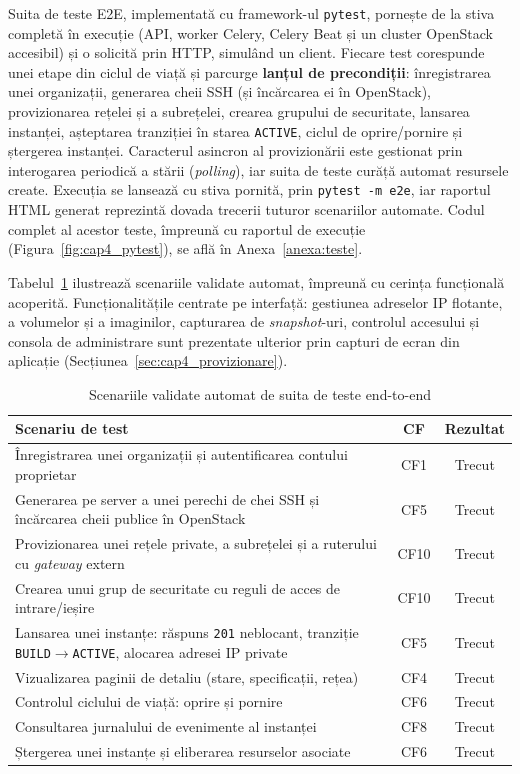 Suita de teste E2E, implementată cu framework-ul \texttt{pytest}, pornește de la stiva completă în execuție (API, worker Celery, Celery Beat și un cluster OpenStack accesibil) și o solicită prin HTTP, simulând un client. Fiecare test corespunde unei etape din ciclul de viață și parcurge \textbf{lanțul de precondiții}: înregistrarea unei organizații, generarea cheii SSH (și încărcarea ei în OpenStack), provizionarea rețelei și a subrețelei, crearea grupului de securitate, lansarea instanței, așteptarea tranziției în starea \texttt{ACTIVE}, ciclul de oprire/pornire și ștergerea instanței. Caracterul asincron al provizionării este gestionat prin interogarea periodică a stării (\textit{polling}), iar suita de teste curăță automat resursele create. Execuția se lansează cu stiva pornită, prin \texttt{pytest -m e2e}, iar raportul HTML generat reprezintă dovada trecerii tuturor scenariilor automate. Codul complet al acestor teste, împreună cu raportul de execuție (Figura~\ref{fig:cap4_pytest}), se află în Anexa~\ref{anexa:teste}.

\noindent Tabelul~\ref{tab:cap4_testcases} ilustrează scenariile validate automat, împreună cu cerința funcțională acoperită. Funcționalitățile centrate pe interfață: gestiunea adreselor IP flotante, a volumelor și a imaginilor, capturarea de \textit{snapshot}-uri, controlul accesului și consola de administrare sunt prezentate ulterior prin capturi de ecran din aplicație (Secțiunea~\ref{sec:cap4_provizionare}).

\begin{table}[H]
    \centering
    \caption{Scenariile validate automat de suita de teste end-to-end}
    \label{tab:cap4_testcases}
    \begin{tabular}{|p{9.4cm}|c|c|}
        \hline
        \textbf{Scenariu de test} & \textbf{CF} & \textbf{Rezultat} \\ \hline
        Înregistrarea unei organizații și autentificarea contului proprietar & CF1 & Trecut \\ \hline
        Generarea pe server a unei perechi de chei SSH și încărcarea cheii publice în OpenStack & CF5 & Trecut \\ \hline
        Provizionarea unei rețele private, a subrețelei și a ruterului cu \textit{gateway} extern & CF10 & Trecut \\ \hline
        Crearea unui grup de securitate cu reguli de acces de intrare/ieșire & CF10 & Trecut \\ \hline
        Lansarea unei instanțe: răspuns \texttt{201} neblocant, tranziție \texttt{BUILD}$\rightarrow$\texttt{ACTIVE}, alocarea adresei IP private & CF5 & Trecut \\ \hline
        Vizualizarea paginii de detaliu (stare, specificații, rețea) & CF4 & Trecut \\ \hline
        Controlul ciclului de viață: oprire și pornire & CF6 & Trecut \\ \hline
        Consultarea jurnalului de evenimente al instanței & CF8 & Trecut \\ \hline
        Ștergerea unei instanțe și eliberarea resurselor asociate & CF6 & Trecut \\ \hline
    \end{tabular}
\end{table}

